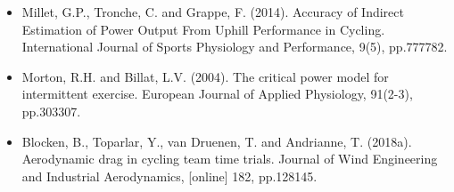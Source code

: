 \documentclass[11pt,a4paper]{ctexart}
\begin{document}
\begin{itemize}
\item[{[12]}] Millet, G.P., Tronche, C. and Grappe, F. (2014). Accuracy of Indirect Estimation of Power Output From Uphill Performance in Cycling. International Journal of Sports Physiology and Performance, 9(5), pp.777782.
\item[{[13]}] Morton, R.H. and Billat, L.V. (2004). The critical power model for intermittent exercise. European Journal of Applied Physiology, 91(2-3), pp.303307.
\item[{[14]}] Blocken, B., Toparlar, Y., van Druenen, T. and Andrianne, T. (2018a). Aerodynamic drag in cycling team time trials. Journal of Wind Engineering and Industrial Aerodynamics, [online] 182, pp.128145.
\end{itemize}
\end{document}
